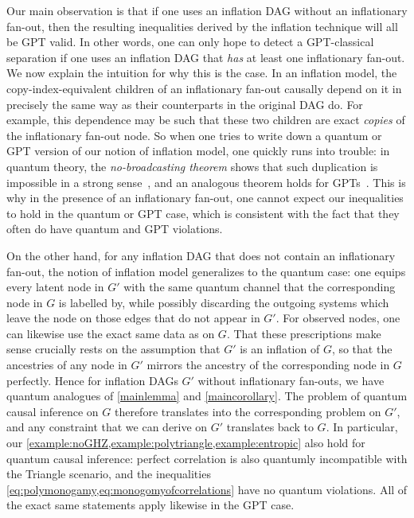 \documentclass[aps,english,superscriptaddress,onecolumn,twoside,longbibliography,pra,floatfix,fleqn,nofootinbib]{revtex4-1}%
\theoremstyle{definition}
\newcounter{example}[section]
\begin{document}
Our main observation is that if one uses an inflation DAG without an inflationary fan-out, then the resulting inequalities derived by the inflation technique will all be GPT valid. In other words, one can only hope to detect a GPT-classical separation if one uses an inflation DAG that \emph{has} at least one inflationary fan-out. We now explain the intuition for why this is the case. 
In an inflation model, the copy-index-equivalent children of an inflationary fan-out causally depend on it in precisely the same way as their counterparts in the original DAG do. For example, this dependence may be such that these two children are exact \emph{copies} of the inflationary fan-out node. So when one tries to write down a quantum or GPT version of our notion of inflation model, one quickly runs into trouble: in quantum theory, the {\em no-broadcasting theorem} shows that such duplication is impossible in a strong sense~\cite{NoCloningQuantum1996}, and an analogous theorem holds for GPTs~\cite{NoCloningGeneral2006}. This is why in the presence of an inflationary fan-out, one cannot expect our inequalities to hold in the quantum or GPT case, which is consistent with the fact that they often do have quantum and GPT violations.

On the other hand, for any inflation DAG that does not contain an inflationary fan-out, the notion of inflation model generalizes to the quantum case: one equips every latent node in $G'$ with the same quantum channel that the corresponding node in $G$ is labelled by, while possibly discarding the outgoing systems which leave the node on those edges that do not appear in $G'$. For observed nodes, one can likewise use the exact same data as on $G$. That these prescriptions make sense crucially rests on the assumption that $G'$ is an inflation of $G$, so that the ancestries of any node in $G'$ mirrors the ancestry of the corresponding node in $G$ perfectly. Hence for inflation DAGs $G'$ without inflationary fan-outs, we have quantum analogues of \cref{mainlemma} and \cref{maincorollary}. The problem of quantum causal inference on $G$ therefore translates into the corresponding problem on $G'$, and any constraint that we can derive on $G'$ translates back to $G$. In particular, our \cref{example:noGHZ,example:polytriangle,example:entropic} also hold for quantum causal inference: perfect correlation is also quantumly incompatible with the Triangle scenario, and the inequalities \cref{eq:polymonogamy,eq:monogomyofcorrelations} have no quantum violations. All of the exact same statements apply likewise in the GPT case.
\end{document}
